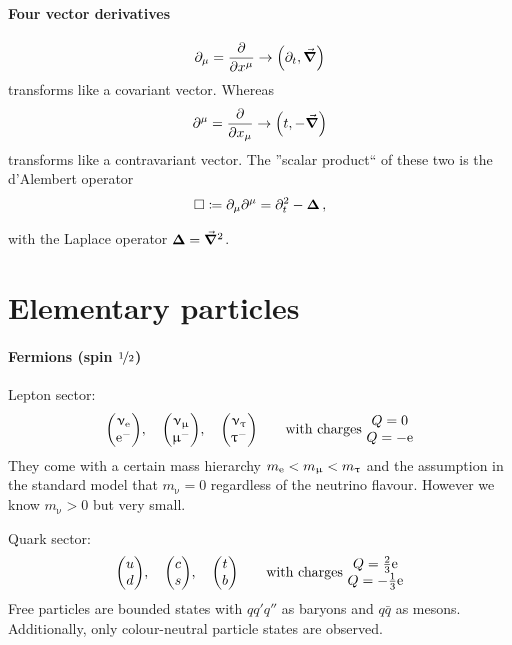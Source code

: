 \paragraph{Four vector derivatives}
\begin{align}
    \partial_\mu = \pdv{x^\mu} \rightarrow \left( \partial_t, \vec \grad \right)
\end{align}
transforms like a covariant vector. Whereas
\begin{align}
    \partial^\mu = \pdv{x_\mu} \rightarrow \qty(t, - \vec \grad)
\end{align}
transforms like a contravariant vector. The ''scalar product`` of these two is the d'Alembert operator
\begin{align}
    \Box \coloneqq \partial_\mu\partial^\mu = \partial_t^2 - \bm{\Delta}\,,
\end{align}
\begin{compactitem}
    \item[with] the Laplace operator $\bm{\Delta} = \vec \grad^2$.
\end{compactitem}

\section{Elementary particles}
\paragraph{Fermions (spin $\nicefrac 12$)} Lepton sector:
\begin{align}
    \mqty(\upnu_\mr{e} \\\mr e^- ), \quad \mqty(\upnu_\upmu \\ \upmu^-),\quad \mqty(\upnu_\uptau \\ \uptau^-) \qquad \text{with charges } \mqty{Q = 0 \\ Q= -\mr e}
\end{align}
They come with a certain mass hierarchy $m_{\mathrm{e}} < m_\upmu < m_\uptau$ and the assumption in the standard model that $m_\upnu = 0$ regardless of the neutrino flavour. However we know $m_\upnu >0$ but very small.

Quark sector:
\begin{align}
    \mqty(u \\ d), \quad \mqty(c \\ s), \quad \mqty( t \\ b) \qquad \text{with charges } \mqty{Q = \frac 23 \mr e \\ Q = - \frac 13 \mr e}
\end{align}
Free particles are bounded states with $qq'q''$ as baryons and $q\bar q$ as mesons. Additionally, only colour-neutral particle states are observed.

